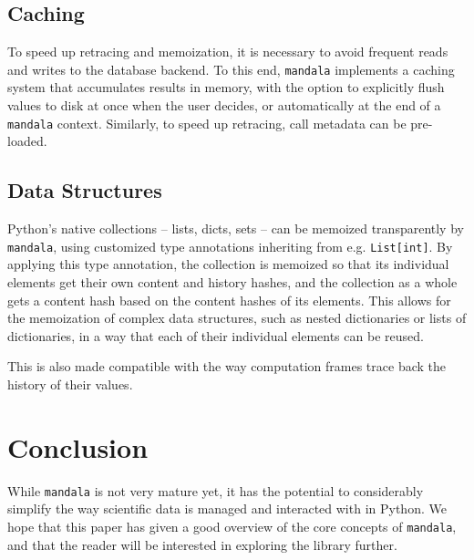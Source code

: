 \documentclass[11pt,twoside=semi,openright,numbers=noenddot]{scrartcl}
\begin{document}
\subsection{Caching}
To speed up retracing and memoization, it is necessary to avoid frequent reads
and writes to the database backend. To this end, \texttt{mandala} implements a
caching system that accumulates results in memory, with the option to explicitly
flush values to disk at once when the user decides, or automatically at the end
of a \texttt{mandala} context. Similarly, to speed up retracing, call metadata can be pre-loaded.

\subsection{Data Structures}
\label{subsection:}

Python's native collections -- lists, dicts, sets -- can be memoized
transparently by \texttt{mandala}, using customized type annotations inheriting
from e.g. \texttt{List[int]}. By applying this type annotation, the collection
is memoized so that its individual elements get their own content and history
hashes, and the collection as a whole gets a content hash based on the content
hashes of its elements. This allows for the memoization of complex data
structures, such as nested dictionaries or lists of dictionaries, in a way that each of their individual elements can be reused. 

This is also made compatible with the way computation frames trace back the history of their values.

\section{Conclusion}
\label{section:}

While \texttt{mandala} is not very mature yet, it has the potential to
considerably simplify the way scientific data is managed and interacted with in
Python. We hope that this paper has given a good overview of the core concepts
of \texttt{mandala}, and that the reader will be interested in exploring the
library further.




\end{document}
